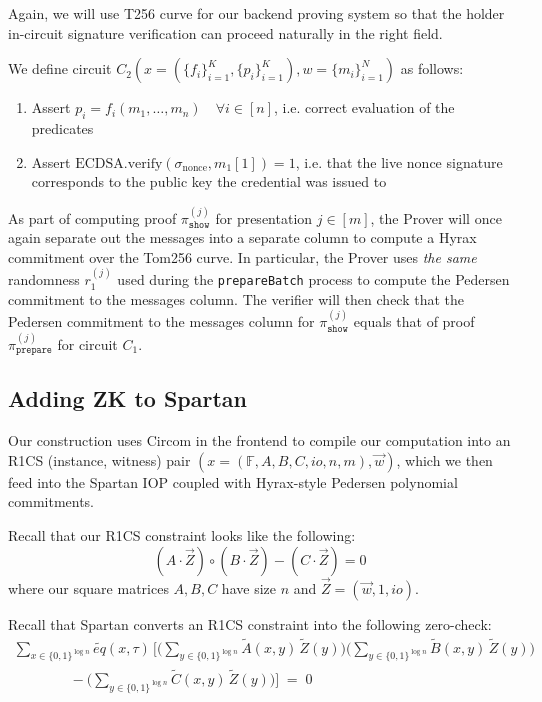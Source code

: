 Again, we will use T256 curve for our backend proving system so that the holder in-circuit signature verification can proceed naturally in the right field.

\begin{mdframed}[style=zkprotocolwithheader, frametitle=Circuit $C_2$ for the \texttt{show} relation]

We define circuit $C_2(x = (\{f_i\}_{i=1}^K, \{p_i\}_{i=1}^K), w = \{m_i\}_{i=1}^N)$ as follows:

\begin{enumerate}
\item Assert $p_i = f_i(m_1, \dots, m_n) \quad \forall i \in [n]$, i.e. correct evaluation of the predicates
\item Assert $\text{ECDSA.verify}(\sigma_{\text{nonce}}, m_1[1]) = 1$, i.e. that the live nonce signature corresponds to the public key the credential was issued to
\end{enumerate}

\end{mdframed}

As part of computing proof $\pi_{\texttt{show}}^{(j)}$ for presentation $j \in [m]$, 
the Prover will once again separate out the messages into a separate column to compute a Hyrax commitment over the Tom256 curve.
In particular, the Prover uses \textit{the same} randomness $r_1^{(j)}$ used during the \texttt{prepareBatch} process
to compute the Pedersen commitment to the messages column.
The verifier will then check that the Pedersen commitment to the messages column for $\pi_{\texttt{show}}^{(j)}$ equals that of proof $\pi_{\texttt{prepare}}^{(j)}$ for circuit $C_1$. 

\subsection{Adding ZK to Spartan}

Our construction uses Circom in the frontend to compile our computation into an R1CS (instance, witness) pair $(x=(\mathbb{F}, A, B, C, io, n, m), \vec{w})$, 
which we then feed into the Spartan IOP coupled with Hyrax-style Pedersen polynomial commitments.

Recall that our R1CS constraint looks like the following:
$$
(A \cdot \vec{Z}) \circ (B \cdot \vec{Z}) - (C \cdot \vec{Z}) = 0
$$
where our square matrices $A, B, C$ have size $n$ and $\vec{Z} = (\vec{w}, 1, io)$.

Recall that Spartan converts an R1CS constraint into the following zero-check:
\begin{multline*}
\sum_{x \in \{0,1\}^{\log n}} \widetilde{eq}(x, \tau)\,
\bigg[
\bigg(\sum_{y \in \{0,1\}^{\log n}} \widetilde{A}(x,y)\,\widetilde{Z}(y)\bigg)
\bigg(\sum_{y \in \{0,1\}^{\log n}} \widetilde{B}(x,y)\,\widetilde{Z}(y)\bigg) \\
\qquad\qquad
- \bigg(\sum_{y \in \{0,1\}^{\log n}} \widetilde{C}(x,y)\,\widetilde{Z}(y)\bigg)
\bigg] \;=\; 0
\end{multline*}

